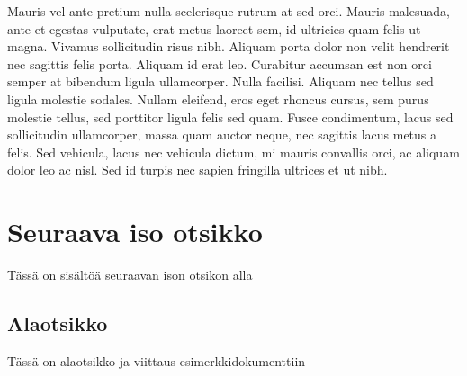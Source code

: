 \documentclass[a4paper]{article}
\begin{document}
Mauris vel ante pretium nulla scelerisque rutrum at sed orci. Mauris malesuada, ante et egestas vulputate, erat metus laoreet sem, id ultricies quam felis ut magna. Vivamus sollicitudin risus nibh. Aliquam porta dolor non velit hendrerit nec sagittis felis porta. Aliquam id erat leo. Curabitur accumsan est non orci semper at bibendum ligula ullamcorper. Nulla facilisi. Aliquam nec tellus sed ligula molestie sodales. Nullam eleifend, eros eget rhoncus cursus, sem purus molestie tellus, sed porttitor ligula felis sed quam. Fusce condimentum, lacus sed sollicitudin ullamcorper, massa quam auctor neque, nec sagittis lacus metus a felis. Sed vehicula, lacus nec vehicula dictum, mi mauris convallis orci, ac aliquam dolor leo ac nisl. Sed id turpis nec sapien fringilla ultrices et ut nibh.

\section{Seuraava iso otsikko}

Tässä on sisältöä seuraavan ison otsikon alla

\subsection{Alaotsikko}

Tässä on alaotsikko ja viittaus esimerkkidokumenttiin \citep{koski2012}




\end{document}
